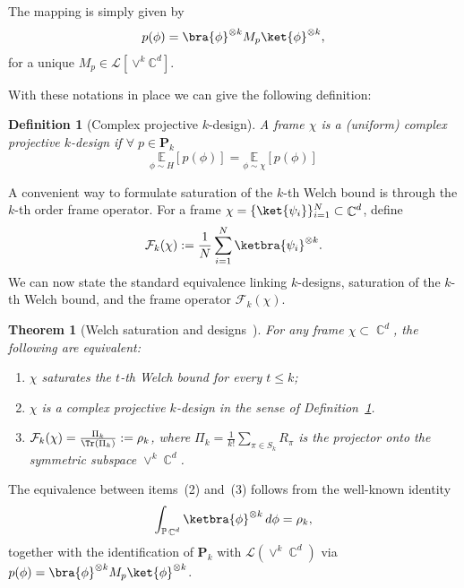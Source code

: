 \documentclass[aps,twocolumn,pra,superscriptaddress,nofootinbib]{revtex4-2}
\newtheorem{thm}{Theorem}
\newtheorem{defn}{Definition}
\DeclareMathOperator{\C}{\mathbb{C}} %
\begin{document}
The mapping is simply given by
\begin{equation}\label{Eq:PolEvaluation}
p(\phi)=\bra{\phi}^{\otimes k} M_p \ket{\phi}^{\otimes k},
\end{equation}
for a unique $M_p\in\mathcal{L}[\vee^k \mathbb{C}^{d}]$. 

With these notations in place we can give the following definition:
\begin{defn}[Complex projective $k$-design]\label{Def:kDesign}
A frame $\chi$ is a (uniform) complex projective $k$-design if $\forall \;  p \in \mathbf{P}_{k}$
\begin{equation}
  \underset{\phi\sim H}{\mathbb{E}}[p(\phi)]
    =\underset{\phi\sim \chi}{\mathbb{E}}[p(\phi)]
\end{equation}
\end{defn}

A convenient way to formulate saturation of the \(k\)-th Welch bound is through the \(k\)-th order frame operator.  
For a frame \(\chi=\{\ket{\psi_i}\}_{i=1}^N\subset\C^{d}\), define
\begin{equation}
  \mathcal F_k(\chi)
  :=\frac{1}{N}\sum_{i=1}^N \ketbra{\psi_i}^{\otimes k}.
\end{equation}
We can now state the standard equivalence linking \(k\)-designs, saturation of the \(k\)-th Welch bound, and the frame operator \(\mathcal F_k(\chi)\).
\begin{thm}[Welch saturation and designs~\cite{WelchBoundGeom(2012),klappenecker2005,Roy2007}]
\label{Th:WelchDesignEquiv}
For any frame $\chi\subset\C^d$, the following are equivalent:
\begin{enumerate}
\item $\chi$ saturates the $t$-th Welch bound for every $t\le k$;
\item $\chi$ is a complex projective $k$-design in the sense of
Definition~\ref{Def:kDesign}.
\item $\mathcal{F}_{k}(\chi)=\frac{\Pi_k}{\Tr(\Pi_k)}:=\rho_{k}$, where $\Pi_k=\frac{1}{k!}\sum_{\pi\in S_k} R_\pi$ is the projector onto the symmetric subspace $\vee^{k}\C^{d}$. 
\end{enumerate}
\end{thm}

The equivalence between items~(2) and~(3) follows from the well-known identity~\cite{harrow2013churchsymmetricsubspace}
\begin{equation}\label{Eq:HaarMomentEqualsRho}
   \int_{\mathbb{P}\C^{d}} \ketbra{\phi}^{\otimes k}\,d\phi=\rho_{k},
\end{equation}
together with the identification of $\mathbf P_k$ with $\mathcal L(\vee^k\C^d)$ via
$p(\phi)=\bra{\phi}^{\otimes k}M_p\ket{\phi}^{\otimes k}$.
\end{document}
